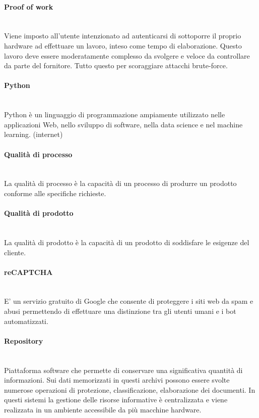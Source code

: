 \paragraph{Proof of work}~\smallskip \\
Viene imposto all'utente intenzionato ad autenticarsi di sottoporre il proprio hardware ad effettuare un lavoro, inteso come tempo di elaborazione. Questo lavoro deve essere moderatamente complesso da svolgere e veloce da controllare da parte del fornitore. Tutto questo per scoraggiare attacchi brute-force.

\paragraph{Python}~\smallskip \\
Python è un linguaggio di programmazione ampiamente utilizzato nelle applicazioni Web, nello sviluppo di software, nella data science e nel machine learning. (internet)

\paragraph{Qualità di processo}~\smallskip \\
La qualità di processo è la capacità di un processo di produrre un prodotto conforme alle specifiche richieste.

\paragraph{Qualità di prodotto}~\smallskip \\
La qualità di prodotto è la capacità di un prodotto di soddisfare le esigenze del cliente.

\paragraph{reCAPTCHA}~\smallskip \\
E' un servizio gratuito di Google che consente di proteggere i siti web da spam e abusi permettendo di effettuare una distinzione tra gli utenti umani e i bot automatizzati.

\paragraph{Repository}~\smallskip \\
Piattaforma software che permette di conservare una significativa quantità di informazioni. Sui dati memorizzati in questi archivi possono essere svolte numerose operazioni di protezione, classificazione, elaborazione dei documenti. In questi sistemi la gestione delle risorse informative è centralizzata e viene realizzata in un ambiente accessibile da più macchine hardware.

